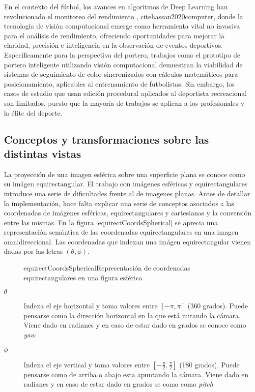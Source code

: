 En el contexto del fútbol, los avances en algoritmos de Deep Learning han revolucionado el monitoreo del rendimiento \cite{cioppa2020arthus}, cite{hassan2020computer}, donde la tecnología de visión computacional emerge como herramienta vital no invasiva para el análisis de rendimiento, ofreciendo oportunidades para mejorar la claridad, precisión e inteligencia en la observación de eventos deportivos. Específicamente para la perspectiva del portero, trabajos como el prototipo de portero inteligente \cite{prasetya2020} utilizando visión computacional demuestran la viabilidad de sistemas de seguimiento de color sincronizados con cálculos matemáticos para posicionamiento, aplicables al entrenamiento de futbolistas. Sin embargo, los casos de estudio que usan edición procedural aplicados al deportista recreacional son limitados, puesto que la mayoría de trabajos se aplican a los profesionales y la élite del deporte.

\subsection{Conceptos y transformaciones sobre las distintas vistas}
La proyección de una imagen esférica sobre una superficie plana se conoce como su imágen equirectangular. El trabajo con imágenes esféricas y equirectangulares introduce una serie de dificultades frente al de imagenes planas. Antes de detallar la implementación, hace falta explicar una serie de conceptos asociados a las coordenadas de imágenes esféricas, equirectangulares y cartesianas y la conversión entre las mismas. En la figura \ref{equirectCoordsSpherical} se aprecia una representación semántica de las coordenadas equirectangulares en una imagen omnidireccional. Las coordenadas que indexan una imágen equirectangular vienen dadas por las letras $(\theta, \phi)$.

\begin{figure}[Representación de sistemas de coordenadas en una esfera]{equirectCoordsSpherical}{Representación de coordenadas equirectangulares en una figura esférica}
	\begin{center}
	\end{center}
\end{figure}

\begin{description}
	\item[$\theta$] Indexa el eje horizontal y toma valores entre $[-\pi, \pi]$ (360 grados). Puede pensarse como la dirección horizontal en la que está mirando la cámara. Viene dado en radianes y en caso de estar dado en grados se conoce como \textit{yaw}
	\item[$\phi$] Indexa el eje vertical y toma valores entre $[-\frac{\pi}{2}, \frac{\pi}{2}]$ (180 grados). Puede pensarse como de arriba o abajo esta apuntando la cámara. Viene dado en radianes y en caso de estar dado en grados se como como \textit{pitch}
\end{description}

